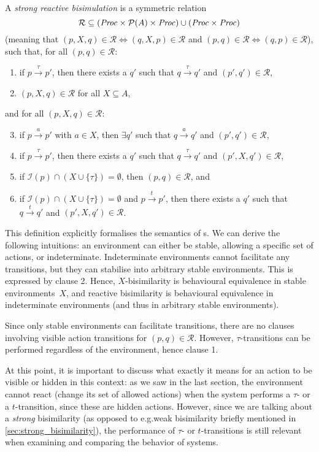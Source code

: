 \begin{isabellebody}
\begin{isamarkuptext}
A \emph{strong reactive bisimulation} is a symmetric relation 
$$\mathcal{R} \subseteq (\mathit{Proc} \times \mathcal{P}(A) \times \mathit{Proc}) \cup (\mathit{Proc} \times \mathit{Proc})$$
(meaning that $(p,X,q)\!\in\!\mathcal{R}\!\iff\!(q,X,p)\!\in\!\mathcal{R}$ and
$(p,q)\!\in\!\mathcal{R}\!\iff\!(q,p)\!\in\!\mathcal{R}$),\\
such that, for all $(p,q) \in \mathcal{R}$:
\begin{enumerate}
    \item if $p \xrightarrow{\tau} p'$, then there exists a $q'$ such that $q \xrightarrow{\tau} q'$ and $(p',q') \in \mathcal{R}$,
    \item $(p,X,q) \in \mathcal{R}$ for all $X \subseteq A$,
\end{enumerate}
and for all $(p,X,q) \in \mathcal{R}$:
\begin{enumerate}
    \setcounter{enumi}{2}
    \item if $p \xrightarrow{a} p'$ with $a \in X$, then $\exists q'$ such that $q \xrightarrow{a} q'$ and $(p',q') \in \mathcal{R}$,
    \item if $p \xrightarrow{\tau} p'$, then there exists a $q'$ such that $q \xrightarrow{\tau} q'$ and $(p',X,q') \in \mathcal{R}$,
    \item if $\mathcal{I}(p) \cap (X \cup \{\tau\}) = \emptyset$, then $(p,q) \in \mathcal{R}$, and
    \item if $\mathcal{I}(p) \cap (X \cup \{\tau\}) = \emptyset$ and $p \xrightarrow{t} p'$, then there exists a $q'$ such that $q \xrightarrow{t} q'$ and $(p',X,q') \in \mathcal{R}$.
\end{enumerate}

This definition explicitly formalises the semantics of \LTSt{}s. We can derive the following intuitions: an environment can either be stable, allowing a specific set of actions, or indeterminate. Indeterminate environments cannot facilitate any transitions, but they can stabilise into arbitrary stable environments. This is expressed by clause 2. Hence, $X$-bisimilarity is behavioural equivalence in stable environments~$X$, and reactive bisimilarity is behavioural equivalence in indeterminate environments (and thus in arbitrary stable environments).

Since only stable environments can facilitate transitions, there are no clauses involving visible action transitions for $(p,q) \in \mathcal{R}$. However, $\tau$-transitions can be performed regardless of the environment, hence clause 1.

At this point, it is important to discuss what exactly it means for an action to be visible or hidden in this context: as we saw in the last section, the environment cannot react (change its set of allowed actions) when the system performs a $\tau$- or a $t$-transition, since these are hidden actions. However, since we are talking about a \emph{strong} bisimilarity (as opposed to e.g.\@ weak bisimilarity briefly mentioned in \cref{sec:strong_bisimilarity}), the performance of $\tau$- or $t$-transitions is still relevant when examining and comparing the behavior of systems.


\end{isamarkuptext}
\end{isabellebody}
